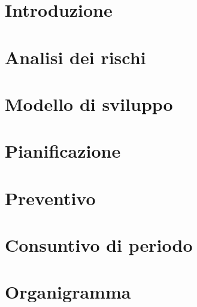 \documentclass[11pt,a4paper]{article}
\begin{document}
	\section{Introduzione}
			
		\newpage	
	
	\section{Analisi dei rischi}
		
		\newpage	

	\section{Modello di sviluppo}
		
		\newpage	

	\section{Pianificazione}
		
		\newpage
				
	\section{Preventivo}
		
		\newpage
				
	\section{Consuntivo di periodo}
		
		\newpage
		
	\appendix
	\section{Organigramma}
		
\end{document}
